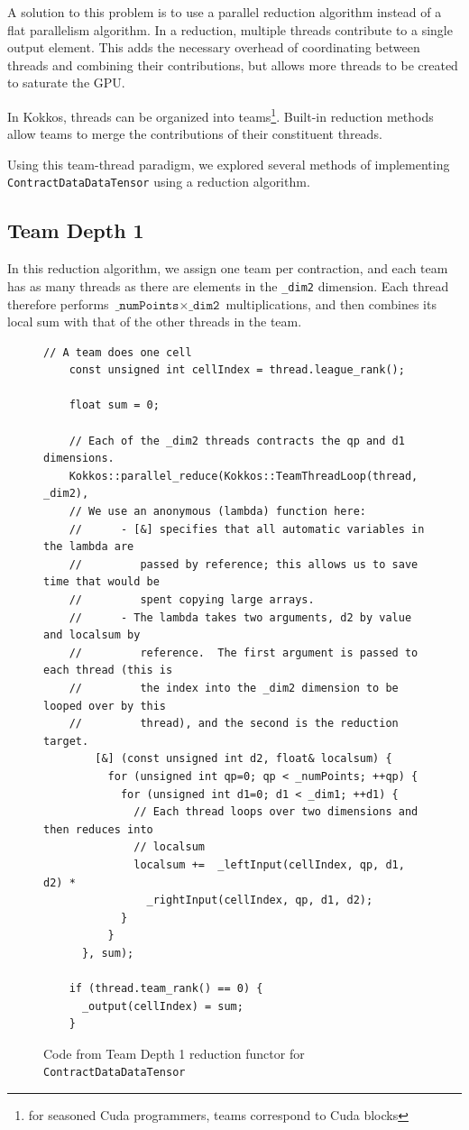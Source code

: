 A solution to this problem is to use a parallel reduction algorithm instead of
a flat parallelism algorithm.  In a reduction, multiple threads contribute to a
single output element.  This adds the necessary overhead of coordinating between
threads and combining their contributions, but allows more threads to be created
to saturate the GPU.

In Kokkos, threads can be organized into teams\footnote{for seasoned Cuda
programmers, teams correspond to Cuda blocks}.  Built-in reduction methods allow
teams to merge the contributions of their constituent threads.

Using this team-thread paradigm, we explored several methods of implementing
\texttt{ContractDataDataTensor} using a reduction algorithm.

\subsection{Team Depth 1}
    In this reduction algorithm, we assign one team per contraction, and each
    team has as many threads as there are elements in the \texttt{\_dim2}
    dimension.  Each thread therefore performs 
    $\texttt{\_numPoints} \times \texttt{\_dim2}$ multiplications, and then
    combines its local sum with that
    of the other threads in the team.


\begin{figure}[ht]
    \begin{lstlisting}[basicstyle=\tiny]
    // A team does one cell
    const unsigned int cellIndex = thread.league_rank();

    float sum = 0;
    
    // Each of the _dim2 threads contracts the qp and d1 dimensions.
    Kokkos::parallel_reduce(Kokkos::TeamThreadLoop(thread, _dim2),
    // We use an anonymous (lambda) function here:
    //      - [&] specifies that all automatic variables in the lambda are
    //         passed by reference; this allows us to save time that would be
    //         spent copying large arrays.
    //      - The lambda takes two arguments, d2 by value and localsum by
    //         reference.  The first argument is passed to each thread (this is
    //         the index into the _dim2 dimension to be looped over by this
    //         thread), and the second is the reduction target.
        [&] (const unsigned int d2, float& localsum) {
          for (unsigned int qp=0; qp < _numPoints; ++qp) {
            for (unsigned int d1=0; d1 < _dim1; ++d1) {
              // Each thread loops over two dimensions and then reduces into
              // localsum
              localsum +=  _leftInput(cellIndex, qp, d1, d2) *
                _rightInput(cellIndex, qp, d1, d2);
            }
          }
      }, sum);

    if (thread.team_rank() == 0) {
      _output(cellIndex) = sum;
    }
 \end{lstlisting}
\caption{Code from Team Depth 1 reduction functor for \texttt{ContractDataDataTensor}
\label{lst:ContractDataDataTensorDepth1Functor}} 
\end{figure}

